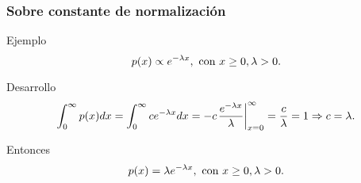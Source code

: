 \documentclass[table]{beamer}
\begin{document}



\begin{frame}
    \frametitle{Sobre constante de normalización}
    \begin{exampleblock}{Ejemplo}
        \begin{equation*}
            \pdf{x} \propto e^{- \lambda x} , \text{ con } x \geq 0 , \lambda > 0 .
        \end{equation*}
    \end{exampleblock}
    \begin{block}{Desarrollo}
        \begin{equation*}
            \int_{0}^{\infty} \pdf{x} d x = \int_{0}^{\infty} c e^{- \lambda x} d x
            = - c \evalparens{\frac{e^{- \lambda x}}{\lambda}}_{x = 0}^{\infty}
            = \frac{c}{\lambda} = 1
            \Rightarrow c = \lambda .
        \end{equation*}
    \end{block}
    \begin{block}{Entonces}
        \begin{equation*}
            \pdf{x} = \lambda e^{- \lambda x} , \text{ con } x \geq 0 , \lambda > 0 .
        \end{equation*}
    \end{block}
\end{frame}
\end{document}
